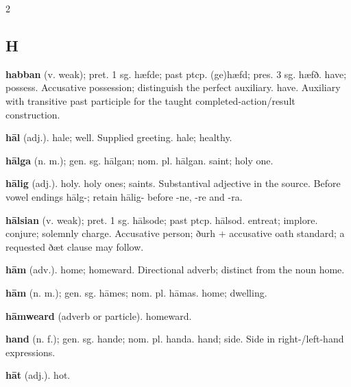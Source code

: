\begin{multicols*}{2}
\subsection*{H}
\textbf{habban} (v. weak); pret. 1 sg. hæfde; past ptcp. (ge)hæfd; pres. 3 sg. hæfð. have; possess. Accusative possession; distinguish the perfect auxiliary. have. Auxiliary with transitive past participle for the taught completed-action/result construction.\par
\textbf{hāl} (adj.). hale; well. Supplied greeting. hale; healthy.\par
\textbf{hālga} (n. m.); gen. sg. hālgan; nom. pl. hālgan. saint; holy one.\par
\textbf{hālig} (adj.). holy. holy ones; saints. Substantival adjective in the source. Before vowel endings hālg-; retain hālig- before -ne, -re and -ra.\par
\textbf{hālsian} (v. weak); pret. 1 sg. hālsode; past ptcp. hālsod. entreat; implore. conjure; solemnly charge. Accusative person; ðurh + accusative oath standard; a requested ðæt clause may follow.\par
\textbf{hām} (adv.). home; homeward. Directional adverb; distinct from the noun home.\par
\textbf{hām} (n. m.); gen. sg. hāmes; nom. pl. hāmas. home; dwelling.\par
\textbf{hāmweard} (adverb or particle). homeward.\par
\textbf{hand} (n. f.); gen. sg. hande; nom. pl. handa. hand; side. Side in right-/left-hand expressions.\par
\textbf{hāt} (adj.). hot.\par

\end{multicols*}
